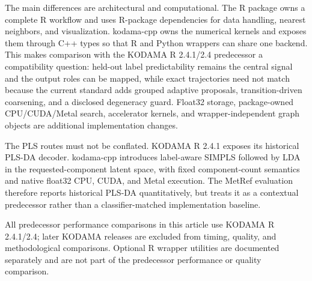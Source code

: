 \documentclass[twoside,11pt]{article}
\begin{document}
\begin{small}
The main differences are architectural and computational. The R package owns a complete R workflow and uses R-package dependencies for data handling, nearest neighbors, and visualization. kodama-cpp owns the numerical kernels and exposes them through C++ types so that R and Python wrappers can share one backend. This makes comparison with the KODAMA R 2.4.1/2.4 predecessor a compatibility question: held-out label predictability remains the central signal and the output roles can be mapped, while exact trajectories need not match because the current standard adds grouped adaptive proposals, transition-driven coarsening, and a disclosed degeneracy guard. Float32 storage, package-owned CPU/CUDA/Metal search, accelerator kernels, and wrapper-independent graph objects are additional implementation changes.

The PLS routes must not be conflated. KODAMA R 2.4.1 exposes its historical PLS-DA decoder. kodama-cpp introduces label-aware SIMPLS followed by LDA in the requested-component latent space, with fixed component-count semantics and native float32 CPU, CUDA, and Metal execution. The MetRef evaluation therefore reports historical PLS-DA quantitatively, but treats it as a contextual predecessor rather than a classifier-matched implementation baseline.

All predecessor performance comparisons in this article use KODAMA R 2.4.1/2.4; later KODAMA releases are excluded from timing, quality, and methodological comparisons. Optional R wrapper utilities are documented separately and are not part of the predecessor performance or quality comparison.


\end{small}
\end{document}
